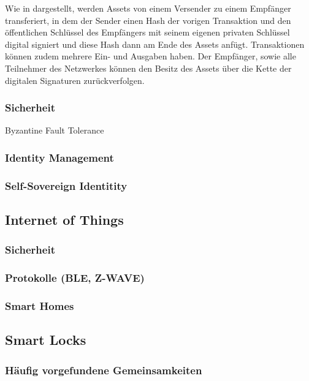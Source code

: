 	    Wie in  dargestellt, werden Assets von einem Versender zu einem Empfänger transferiert, in dem der Sender einen Hash der vorigen Transaktion und den öffentlichen Schlüssel des Empfängers mit seinem eigenen privaten Schlüssel digital signiert und diese Hash dann am Ende des Assets anfügt.
	    Transaktionen können zudem mehrere Ein- und Ausgaben haben\cite{Nakamoto2008}.
	    Der Empfänger, sowie alle Teilnehmer des Netzwerkes können den Besitz des Assets über die Kette der digitalen Signaturen zurückverfolgen\cite{Nakamoto2008}.
    
    
    \begin{figure}[H]
    \end{figure}
    
    \subsubsection{Sicherheit}
    \label{sec:blockchain_security}
    Byzantine Fault Tolerance
    
    \subsubsection{Identity Management}
    \label{sec:blockchain_identitymgmnt}
    \subsubsection{Self-Sovereign Identitity}
    \label{sec:blockchain_sovreign}

\subsection{Internet of Things}
    \subsubsection{Sicherheit}
    \subsubsection{Protokolle (BLE, Z-WAVE)}
    \subsubsection{Smart Homes}

\subsection{Smart Locks}
    \subsubsection{Häufig vorgefundene Gemeinsamkeiten}



